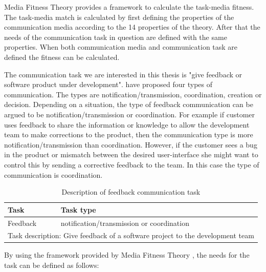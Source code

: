\documentclass[english,12pt,a4paper,pdftex]{article}
\begin{document}
Media Fitness Theory provides a framework to calculate the task-media fitness. The task-media match is calculated by first defining the properties of the communication media according to the 14 properties of the theory. After that the needs of the communication task in question are defined with the same properties. When both communication media and communication task are defined the fitness can be calculated.

The communication task we are interested in this thesis is "give feedback or software product under development". \citet{nakamura1995} have proposed four types of communication. The types are notification/transmission, coordination, creation or decision. Depending on a situation, the type of feedback communication can be argued to be notification/transmission or coordination. For example if customer uses feedback to share the information or knowledge to allow the development team to make corrections to the product, then the communication type is more notification/transmission than coordination. However, if the customer sees a bug in the product or mismatch between the desired user-interface she might want to control this by sending a corrective feedback to the team. In this case the type of communication is coordination.

\begin{table}[!h]
\renewcommand{\arraystretch}{1.3}
\caption{Description of feedback communication task}
\label{table:description_feedback_communication_task}
\centering
\begin{tabular}{|p{7cm}|p{7cm}|}
\hline
\textbf{Task} & \textbf{Task type}\\
\hline
Feedback & notification/transmission or coordination\\
\hline
\multicolumn{2}{|l|}{Task description:
Give feedback of a software project to the development team} \\ \hline
\end{tabular}
\end{table}

By using the framework provided by Media Fitness Theory \citep{higa2007}, the needs for the task can be defined as follows:
\end{document}

